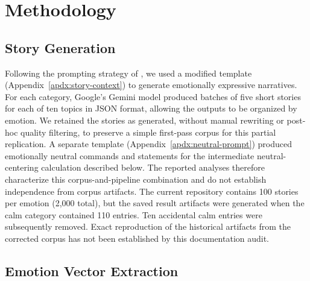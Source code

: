 \section{Methodology}
\label{sec:methodology}

\subsection{Story Generation}

Following the prompting strategy of \cite{sofroniew_emotion_2026}, we used a modified template
(Appendix~\ref{apdx:story-context}) to generate emotionally expressive narratives. For each category, Google's Gemini model
produced batches of five short stories for each of ten topics in JSON format, allowing the outputs to be organized by emotion.
We retained the stories as generated, without manual rewriting or post-hoc quality filtering, to preserve a simple first-pass
corpus for this partial replication. A separate template (Appendix~\ref{apdx:neutral-prompt}) produced emotionally neutral
commands and statements for the intermediate neutral-centering calculation described below. The reported analyses therefore
characterize this corpus-and-pipeline combination and do not establish independence from corpus artifacts. The current repository
contains 100 stories per emotion (2,000 total), but the saved result artifacts were generated when the calm category contained 110
entries. Ten accidental calm entries were subsequently removed. Exact reproduction of the historical artifacts from the corrected
corpus has not been established by this documentation audit.

\subsection{Emotion Vector Extraction}


